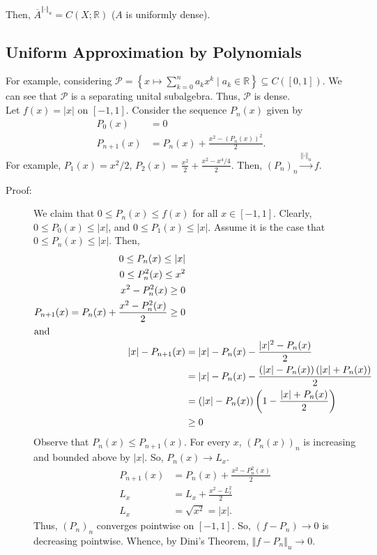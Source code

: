 \documentclass[10pt]{extarticle}
\newcommand{\R}{\mathbb{R}}
\newcommand{\norm}[1]{\left\Vert #1 \right\Vert}
\begin{document}
  Then, $\overline{A}^{\norm{\cdot}_u} = C(X;\R)$ ($A$ is uniformly dense).
  \subsection{Uniform Approximation by Polynomials}%
  For example, considering $\mathcal{P} = \left\{x\mapsto \sum_{k=0}^{n}a_kx^k\mid a_k\in \R\right\}\subseteq C([0,1])$. We can see that $\mathcal{P}$ is a separating unital subalgebra. Thus, $\mathcal{P}$ is dense.\\

  Let $f(x) = |x|$ on $[-1,1]$. Consider the sequence $P_n(x)$ given by
  \begin{align*}
    P_0(x) &= 0\\
    P_{n+1}(x) &= P_n(x) + \frac{x^2 - (P_n(x))^2}{2}.
  \end{align*}
  For example, $P_1(x) = x^2/2$, $P_2(x) = \frac{x^2}{2} + \frac{x^2 - x^4/4}{2}$. Then, $(P_n)_n \xrightarrow{\norm{\cdot}_u} f$.
  \begin{description}
    \item[Proof:] We claim that $0\leq P_n(x)\leq f(x)$ for all $x\in [-1,1]$. Clearly, $0\leq P_0(x) \leq |x|$, and $0 \leq P_1(x)\leq |x|$. Assume it is the case that $0\leq P_n(x) \leq |x|$. Then,
      \begin{align*}
        0\leq P_n(x) \leq |x|\\
        0\leq P_n^2(x) \leq x^2\\
        x^2 - P_n^2(x) \geq 0\\
        P_{n+1}(x) = P_{n}(x) + \frac{x^2-P_n^2(x)}{2} \geq 0\\
        \intertext{and}
        |x| - P_{n+1}(x) &= |x| - P_n(x) - \frac{|x|^2 - P_n(x)}{2}\\
                         &= |x| - P_n(x) - \frac{\left(|x|-P_n(x)\right)\left(|x| + P_n(x)\right)}{2}\\
                         &= \left(|x|-P_n(x)\right)\left(1-\frac{|x| + P_n(x)}{2}\right)\\
                         &\geq 0
      \end{align*}
      Observe that $P_n(x) \leq P_{n+1}(x)$. For every $x$, $(P_n(x))_n$ is increasing and bounded above by $|x|$. So, $P_n(x) \rightarrow L_x$.
      \begin{align*}
        P_{n+1}(x) &= P_{n}(x) + \frac{x^2 - P_n^2(x)}{2}\\
        L_x &= L_x + \frac{x^2 - L_x^2}{2}\\
        L_x &= \sqrt{x^2} = |x|.
      \end{align*}
      Thus, $(P_n)_n$ converges pointwise on $[-1,1]$. So, $(f-P_n)\rightarrow 0$ is decreasing pointwise. Whence, by Dini's Theorem, $\norm{f-P_n}_u \rightarrow 0$.
  \end{description}
\end{document}
